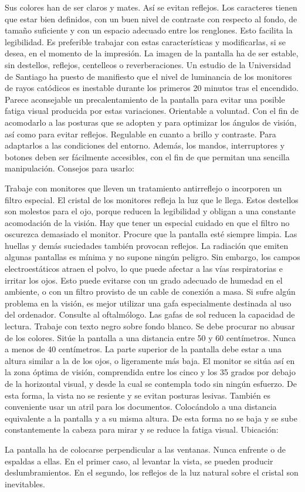 Sus colores han de ser claros y mates. Así se evitan reflejos.
Los caracteres tienen que estar bien definidos, con un buen nivel de contraste con respecto al fondo, de tamaño suficiente y con un espacio adecuado entre los renglones.
Esto facilita la legibilidad. Es preferible trabajar con estas características y modificarlas, si se desea, en el momento de la impresión.
La imagen de la pantalla ha de ser estable, sin destellos, reflejos, centelleos o reverberaciones. Un estudio de la Universidad de Santiago ha puesto de manifiesto que el nivel de luminancia de los monitores de rayos catódicos es inestable durante los primeros 20 minutos tras el encendido. Parece aconsejable un precalentamiento de la pantalla para evitar una posible fatiga visual producida por estas variaciones.
Orientable a voluntad. Con el fin de acomodarlo a las posturas que se adopten y para optimizar los ángulos de visión, así como para evitar reflejos.
Regulable en cuanto a brillo y contraste. Para adaptarlos a las condiciones del entorno. Además, los mandos, interruptores y botones deben ser fácilmente accesibles, con el fin de que permitan una sencilla manipulación.
Consejos para usarlo:

Trabaje con monitores que lleven un tratamiento antirreflejo o incorporen un filtro especial. El cristal de los monitores refleja la luz que le llega. Estos destellos son molestos para el ojo, porque reducen la legibilidad y obligan a una constante acomodación de la visión. Hay que tener un especial cuidado en que el filtro no oscurezca demasiado el monitor.
Procure que la pantalla esté siempre limpia. Las huellas y demás suciedades también provocan reflejos. La radiación que emiten algunas pantallas es mínima y no supone ningún peligro. Sin embargo, los campos electroestáticos atraen el polvo, lo que puede afectar a las vías respiratorias e irritar los ojos. Esto puede evitarse con un grado adecuado de humedad en el ambiente, o con un filtro provisto de un cable de conexión a masa.
Si sufre algún problema en la visión, es mejor utilizar una gafa especialmente destinada al uso del ordenador. Consulte al oftalmólogo. Las gafas de sol reducen la capacidad de lectura.
Trabaje con texto negro sobre fondo blanco. Se debe procurar no abusar de los colores.
Sitúe la pantalla a una distancia entre 50 y 60 centímetros. Nunca a menos de 40 centímetros.
La parte superior de la pantalla debe estar a una altura similar a la de los ojos, o ligeramente más baja. El monitor se sitúa así en la zona óptima de visión, comprendida entre los cinco y los 35 grados por debajo de la horizontal visual, y desde la cual se contempla todo sin ningún esfuerzo. De esta forma, la vista no se resiente y se evitan posturas lesivas.
También es conveniente usar un atril para los documentos. Colocándolo a una distancia equivalente a la pantalla y a su misma altura. De esta forma no se baja y se sube constantemente la cabeza para mirar y se reduce la fatiga visual.
Ubicación:

La pantalla ha de colocarse perpendicular a las ventanas. Nunca enfrente o de espaldas a ellas. En el primer caso, al levantar la vista, se pueden producir deslumbramientos. En el segundo, los reflejos de la luz natural sobre el cristal son inevitables.
